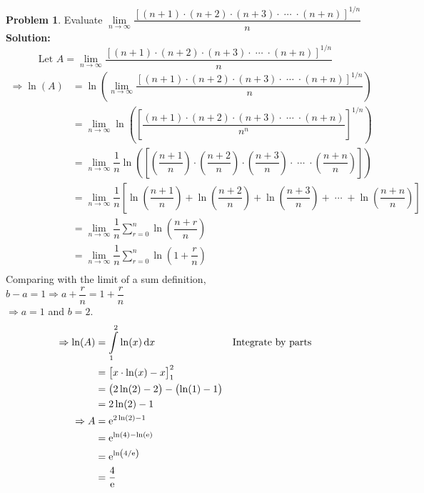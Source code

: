 \documentclass[14]{article}
\theoremstyle{definition}
\newtheorem{prob}{Problem}
\theoremstyle{case}
\begin{document}
\begin{prob}
Evaluate $\lim\limits_{n \to \infty} \dfrac{\left[ (n+1) \cdot (n+2) \cdot (n+3) \cdot \; \cdots \; \cdot (n + n) \right]^{1/n}}n$\\
\textbf{Solution:}\\
\[\text{Let } A = \lim\limits_{n \to \infty} \dfrac{\left[ (n+1) \cdot (n+2) \cdot (n+3) \cdot \; \cdots \; \cdot (n + n) \right]^{1/n}}n\]
\begin{align*}
\Rightarrow \ln(A) &= \ln\left( \lim\limits_{n \to \infty} \dfrac{\left[ (n+1) \cdot (n+2) \cdot (n+3) \cdot \; \cdots \; \cdot (n + n) \right]^{1/n}}n \right)\\
&= \lim\limits_{n \to \infty} \ln\left( \left[\dfrac{ (n+1) \cdot (n+2) \cdot (n+3) \cdot \; \cdots \; \cdot (n + n) }{n^n}\right]^{1/n} \right)\\
&= \lim\limits_{n \to \infty}\dfrac1{n} \ln\left( \left[ \left(\dfrac{n+1}{n}\right) \cdot \left(\dfrac{n+2}{n}\right) \cdot \left(\dfrac{n+3}{n}\right) \cdot \; \cdots \; \cdot \left(\dfrac{n+n}{n}\right) \right] \right)\\
&= \lim\limits_{n \to \infty} \dfrac1{n} \left[ \ln\left(\dfrac{n+1}{n}\right) + \ln\left(\dfrac{n+2}{n}\right) + \ln\left(\dfrac{n+3}{n}\right) + \; \cdots \; + \ln\left(\dfrac{n+n}{n}\right) \right]\\
&= \lim\limits_{n \to \infty} \dfrac1n \sum\limits_{r=0}^n \ln\left(\dfrac{n+r}{n}\right)\\
&= \lim\limits_{n \to \infty} \dfrac1n \sum\limits_{r=0}^n \ln\left(1 +\dfrac{r}{n}\right)\\
\end{align*}
Comparing with the limit of a sum definition,\\
$b - a= 1 \Rightarrow a + \dfrac{r}{n} = 1 + \dfrac{r}{n}$\\
$\Rightarrow a = 1$ and $b = 2$.
\begin{align*}
\Rightarrow \ln(A) &= \int\limits_1^2 \ln(x) \dif x && \text{Integrate by parts}\\
&= \left[x \cdot \ln(x) - x \right]_1^2\\
&= \left( 2\ln(2) - 2 \right) - \left(\ln(1) - 1\right)\\
&= 2\ln(2) - 1\\
\Rightarrow A &= {\rm e}^{2\ln(2) - 1}\\
&= {\rm e}^{\ln(4) - \ln({\rm e})}\\
&= {\rm e}^{\ln\left( 4/{\rm e} \right)}\\
&= \dfrac{4}{\rm e}
\end{align*}
\end{prob}
\end{document}
